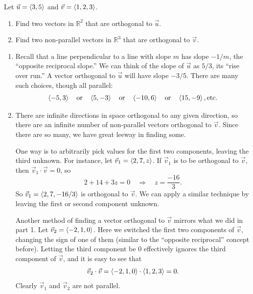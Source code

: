 \begin{example}\label{ex_dotp8}%
Let $\vec u = \left\langle 3,5\right\rangle$ and $\vec v = \left\langle 1,2,3\right\rangle$. 
\begin{enumerate}
	\item Find two vectors in $\mathbb{R}^2$ that are orthogonal to $\vec u$.
	\item	Find two non-parallel vectors in $\mathbb{R}^3$ that are orthogonal to $\vec v$.
\end{enumerate}
\solution
\begin{enumerate}
	\item Recall that a line perpendicular to a line with slope $m$ has slope $-1/m$, the ``opposite reciprocal slope.'' We can think of the slope of $\vec u$ as $5/3$, its ``rise over run.'' A vector orthogonal to $\vec u$ will have slope $-3/5$. There are many such choices, though all parallel:
	\[\left\langle -5,3\right\rangle\quad \text{or} \quad\left\langle 5,-3\right\rangle\quad \text{or} \quad \left\langle -10,6\right\rangle\quad \text{or} \quad \left\langle 15,-9\right\rangle,\text{etc.}\]
	\item		There are infinite directions in space orthogonal to any given direction, so there are an infinite number of non-parallel vectors orthogonal to $\vec v$. Since there are so many, we have great leeway in finding some.
	
	One way is to arbitrarily pick values for the first two components, leaving the third unknown. For instance, let $\vec v_1 = \left\langle 2,7,z\right\rangle$. If $\vec v_1$ is to be orthogonal to $\vec v$, then $\vec v_1\cdot\vec v = 0$, so 
	\[2+14+3z=0 \quad \Rightarrow \quad z = \frac{-16}{3}.\]
	So $\vec v_1 = \left\langle 2, 7, -16/3\right\rangle$ is orthogonal to $\vec v$. We can apply a similar technique by leaving the first or second component unknown.
	
	Another method of finding a vector orthogonal to $\vec v$ mirrors what we did in part 1. Let $\vec v_2 = \left\langle -2,1,0\right\rangle$. Here we switched the first two components of $\vec v$, changing the sign of one of them (similar to the ``opposite reciprocal'' concept before). Letting the third component be 0 effectively ignores the third component of $\vec v$, and it is easy to see that 
	\[\vec v_2\cdot\vec v = \left\langle -2,1,0\right\rangle\cdot\left\langle 1,2,3\right\rangle= 0.\]
	Clearly $\vec v_1$ and $\vec v_2$ are not parallel.
\end{enumerate}
\end{example}

